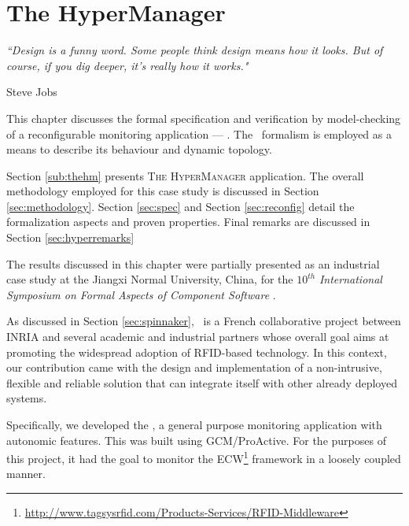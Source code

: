 
\chapter{The HyperManager} 
\label{chap:hyper} 

\epigraph{\textit{“Design is a funny word. Some people think design means how it looks. 
                             But of course, if you dig deeper, it's really how it works."}}{Steve Jobs}


 This chapter discusses the formal specification and verification by model-checking 
 of a reconfigurable monitoring application --- \thehm. The \pnets\ formalism is 
 employed as a means to describe its behaviour and dynamic topology. 
 
	Section \ref{sub:thehm} presents \textsc{The HyperManager} application. The overall
	methodology employed for this case study is discussed in Section \ref{sec:methodology}.
	Section \ref{sec:spec} and Section \ref{sec:reconfig} detail the formalization aspects and
	proven properties. Final remarks
	are discussed in Section \ref{sec:hyperremarks}
 
	The results discussed in this chapter were partially presented as an industrial case study at the Jiangxi Normal University, China, for the $10^{th}$ \textit{International Symposium on Formal Aspects of Component Software} \cite{GASHENMAD:FACS13}.


\minitoc




  As discussed in Section \ref{sec:spinnaker}, \spinnaker\ is a French collaborative
  project between INRIA and several academic and industrial partners whose overall goal
  aims at promoting the widespread adoption of \ac{RFID}-based technology. In this context,
  our contribution came with the design and implementation of a non-intrusive, flexible and 
  reliable solution that can integrate itself with other already deployed systems. 
  	
	Specifically, we developed the \thehm, a general purpose monitoring
	application with autonomic features. This was built using GCM/ProActive. For the purposes
	of this project, it had the goal to monitor the \ac{ECW}\footnote{\url{http://www.tagsysrfid.com/Products-Services/RFID-Middleware}}  
	framework in a loosely coupled manner.
	
